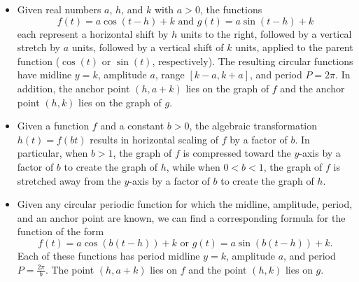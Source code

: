 \documentclass{ximera}
\begin{document}
\begin{summary}
\begin{itemize}[label=\textbullet]
\item
Given real numbers \(a\), \(h\), and \(k\) with \(a > 0\), the functions%
\begin{equation*}
f(t) = a\cos(t-h)+k \text{ and } g(t) = a\sin(t-h) + k
\end{equation*}
each represent a horizontal shift by \(h\) units to the right, followed by a vertical stretch by \(a\) units, followed by a vertical shift of \(k\) units, applied to the parent function (\(\cos(t)\) or \(\sin(t)\), respectively).  The resulting circular functions have midline \(y = k\), amplitude \(a\), range \([k-a,k+a]\), and period \(P = 2\pi\).  In addition, the anchor point \((h,a+k)\) lies on the graph of \(f\) and the anchor point \((h,k)\) lies on the graph of \(g\).%
\item
Given a function \(f\) and a constant \(b > 0\), the algebraic transformation \(h(t) = f(bt)\) results in horizontal scaling of \(f\) by a factor of \(b\).  In particular, when \(b > 1\), the graph of \(f\) is compressed toward the \(y\)-axis by a factor of \(b\) to create the graph of \(h\), while when \(0 < b < 1\), the graph of \(f\) is stretched away from the \(y\)-axis by a factor of \(b\) to create the graph of \(h\).%
\item
Given any circular periodic function for which the midline, amplitude, period, and an anchor point are known, we can find a corresponding formula for the function of the form%
\begin{equation*}
f(t) = a\cos(b(t-h))+k \text{ or } g(t) = a\sin(b(t-h)) + k\text{.}
\end{equation*}
Each of these functions has period midline \(y = k\), amplitude \(a\), and period \(P = \frac{2\pi}{b}\).  The point \((h,a+k)\) lies on \(f\) and the point \((h,k)\) lies on \(g\).%
\end{itemize}
\end{summary}
%
%
\end{document}
